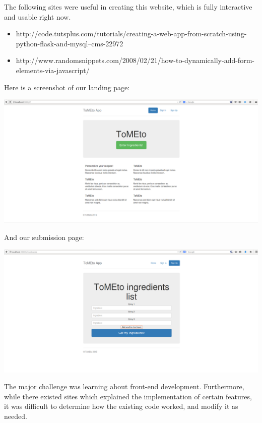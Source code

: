 \documentclass{article}
\begin{document}
The following sites were useful in creating this website, which is fully interactive and usable right now.
\begin{itemize}
\item http://code.tutsplus.com/tutorials/creating-a-web-app-from-scratch-using-python-flask-and-mysql--cms-22972
\item http://www.randomsnippets.com/2008/02/21/how-to-dynamically-add-form-elements-via-javascript/
\end{itemize}

Here is a screenshot of our landing page: \\
\begin{center}
\includegraphics[scale=0.4]{firstpage.PNG}
\end{center}

And our submission page: \\
\begin{center}
\includegraphics[scale=0.4]{secondpage.PNG}
\end{center}


The major challenge was learning about front-end development. Furthermore, while there existed sites which explained the implementation of certain features, it was difficult to determine how the existing code worked, and modify it as needed.
\end{document}
